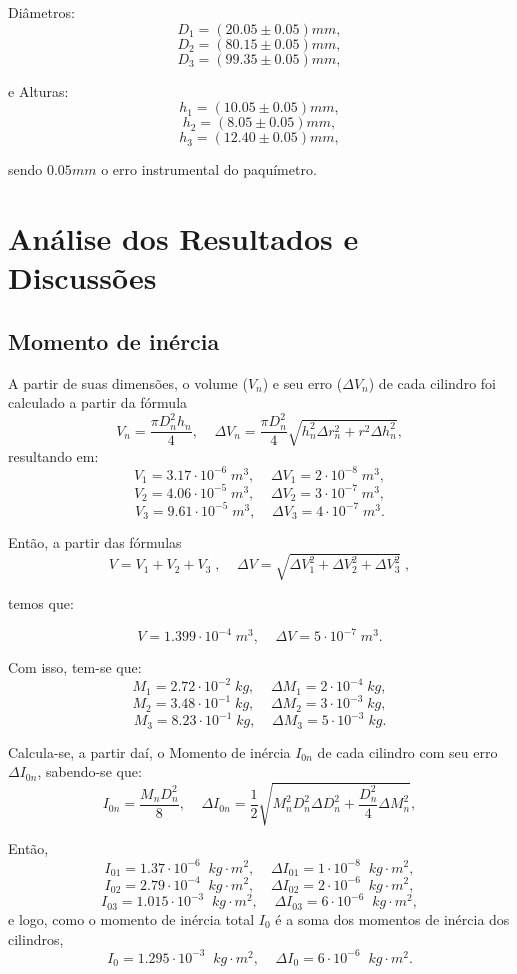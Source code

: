 \documentclass[12pt,a4paper]{article}
\begin{document}
Diâmetros:
$$ D_1 = (20.05 \pm 0.05)mm, $$
$$ D_2 = (80.15 \pm 0.05)mm, $$
$$ D_3 = (99.35 \pm 0.05)mm, $$

e Alturas:
$$ h_1 = (10.05 \pm 0.05)mm, $$
$$ h_2 = (8.05 \pm 0.05)mm, $$
$$ h_3 = (12.40 \pm 0.05)mm, $$

sendo $0.05mm$ o erro instrumental do paquímetro.\\


\section{Análise dos Resultados e Discussões}
\subsection{Momento de inércia}
A partir de suas dimensões, o volume ($V_n$) e seu erro ($\Delta V_n$) de cada cilindro foi calculado a partir da fórmula
$$V_n = \frac{\pi D_n^2 h_n}{4}, \; \; \;  \; \Delta V_n = \frac {\pi D_n^2}{4} \sqrt{h_n^2 \Delta r_n^2 + r^2 \Delta h_n^2},$$
resultando em:
$$V_1 = 3.17 \cdot 10 ^ {-6} \; m^3, \; \; \; \; \Delta V_1 = 2 \cdot 10 ^ {-8} \; m^3,$$
$$V_2 = 4.06 \cdot 10 ^ {-5} \; m^3, \; \; \; \; \Delta V_2 = 3 \cdot 10 ^ {-7} \; m^3,$$ 
$$V_3 = 9.61 \cdot 10 ^ {-5} \; m^3, \; \; \; \; \Delta V_3 = 4 \cdot 10 ^ {-7} \; m^3.$$ 

Então, a partir das fórmulas
$$V = V_1 + V_2 + V_3 \; , \; \; \; \; \Delta V = \sqrt{\Delta V_1^2 + \Delta V_2^2 + \Delta V_3^2}\;, $$

temos que:

$$V = 1.399 \cdot 10 ^ {-4} \; m^3, \; \; \; \; \Delta V = 5 \cdot 10^ {-7} \; m^3.$$

Com isso, tem-se que:
$$M_1 = 2.72 \cdot 10^{-2} \; kg, \; \; \; \; \Delta M_1 = 2 \cdot 10^{-4} \; kg,$$
$$M_2 = 3.48 \cdot 10^{-1} \; kg, \; \; \; \; \Delta M_2 = 3 \cdot 10^{-3} \; kg,$$
$$M_3 = 8.23 \cdot 10^{-1} \; kg, \; \; \; \; \Delta M_3 = 5 \cdot 10^{-3} \; kg.$$

Calcula-se, a partir daí, o Momento de inércia $I_{0n}$ de cada cilindro com seu erro $\Delta I_{0n}$, sabendo-se que:
$$I_{0n} = \frac{M_nD_n^2}{8}, \; \; \; \; \Delta I_{0n} = \frac {1}{2} \sqrt{M_n^2D_n^2 \Delta D_n^2 + \frac{D_n^2}{4} \Delta M_n^2},$$

Então,
$$I_{01} = 1.37 \cdot 10^{-6} \; \; kg \cdot m^2, \; \; \; \; \Delta I_{01} = 1 \cdot 10^{-8} \; \; kg \cdot m^2,$$
$$I_{02} = 2.79 \cdot 10^{-4} \; \; kg \cdot m^2, \; \; \; \; \Delta I_{02} = 2 \cdot 10^{-6} \; \; kg \cdot m^2,$$
$$I_{03} = 1.015 \cdot 10^{-3} \; \; kg \cdot m^2, \; \; \; \; \Delta I_{03} = 6 \cdot 10^{-6} \; \; kg \cdot m^2,$$
e logo, como o momento de inércia total $I_0$ é a soma dos momentos de inércia dos cilindros,
$$I_0 = 1.295 \cdot 10^{-3} \; \; kg \cdot m^2, \; \; \; \; \Delta I_0 = 6 \cdot 10^{-6} \; \; kg \cdot m^2.$$
\end{document}
